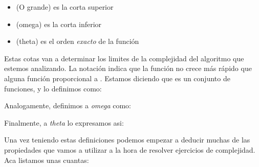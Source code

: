 \documentclass{article}
\begin{document}
\begin{itemize}
	\item[]  (O grande) es la corta superior
	\item[] \formula{\Omega} (omega) es la corta inferior
	\item[] \formula{\theta} (theta) es el orden \textit{exacto} de la función
\end{itemize}

Estas cotas van a determinar los limites de la complejidad del algoritmo que estemos analizando. La notación  indica que la función  no crece más rápido que alguna función proporcional a . Estamos diciendo que  es un conjunto de funciones, y lo definimos como:


Analogamente, definimos a \textit{omega} como:


Finalmente, a \textit{theta} lo expresamos asi:


Una vez teniendo estas definiciones podemos empezar a deducir muchas de las propiedades que vamos a utilizar a la hora de resolver ejercicios de complejidad. Aca listamos unas cuantas:
\end{document}
